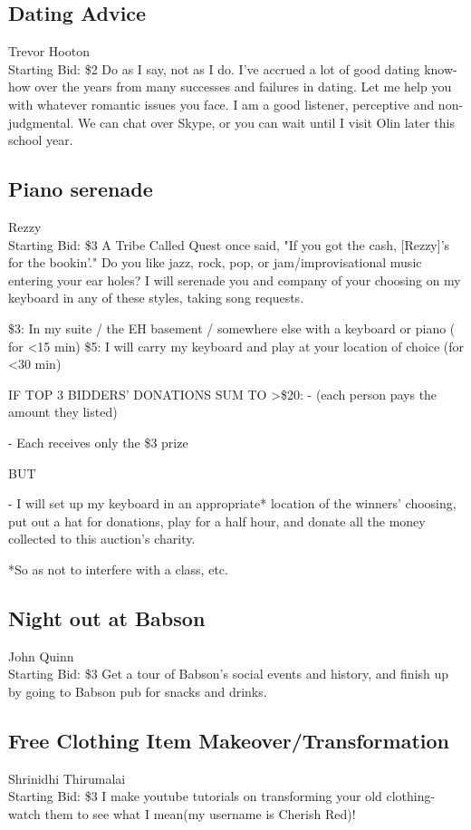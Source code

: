 \documentclass[11pt]{article}
\begin{document}
\subsection{Dating Advice}
Trevor Hooton
\\
Starting Bid: \$2
\newline
Do as I say, not as I do. I've accrued a lot of good dating know-how over the years from many successes and failures in dating. Let me help you with whatever romantic issues you face. I am a good listener, perceptive and non-judgmental. 
We can chat over Skype, or you can wait until I visit Olin later this school year.
\subsection{Piano serenade}
Rezzy
\\
Starting Bid: \$3
\newline
A Tribe Called Quest once said, "If you got the cash, [Rezzy]'s for the bookin'." Do you like jazz, rock, pop, or jam/improvisational music entering your ear holes? I will serenade you and company of your choosing on my keyboard in any of these styles, taking song requests.

\$3: In my suite / the EH basement / somewhere else with a keyboard or piano ( for <15 min)
\$5: I will carry my keyboard and play at your location of choice (for <30 min)

IF TOP 3 BIDDERS' DONATIONS SUM TO >\$20:
- (each person pays the amount they listed)

- Each receives only the \$3 prize

BUT

- I will set up my keyboard in an appropriate* location of the winners' choosing, put out a hat for donations, play for a half hour, and donate all the money collected to this auction's charity.


*So as not to interfere with a class, etc.
\subsection{Night out at Babson}
John Quinn
\\
Starting Bid: \$3
\newline
Get a tour of Babson's social events and history, and finish up by going to Babson pub for snacks and drinks.
\subsection{Free Clothing Item Makeover/Transformation}
Shrinidhi Thirumalai
\\
Starting Bid: \$3
\newline
I make youtube tutorials on transforming your old clothing- watch them to see what I mean(my username is Cherish Red)! 
\end{document}
